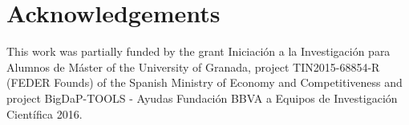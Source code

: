 \section*{Acknowledgements}
\label{p2sec.acknowledgements}

This work was partially funded by the grant Iniciaci{\'o}n a la Investigaci{\'o}n para Alumnos de M{\'a}ster of the University of Granada, project TIN2015-68854-R (FEDER Founds) of the Spanish Ministry of Economy and Competitiveness and project BigDaP-TOOLS - Ayudas
Fundaci{\'o}n BBVA a Equipos de Investigaci{\'o}n  Cient{\'i}fica
2016.
